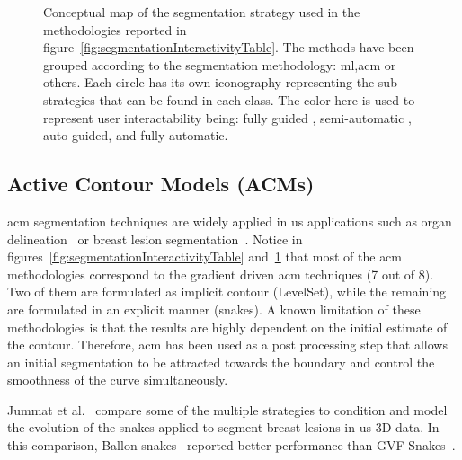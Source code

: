 \documentclass[authoryear,preprint,review,12pt]{elsarticle}
\begin{document}
\begin{landscape}
\begin{figure}
\begin{tikzpicture}[scale=4.5, every node/.style={scale=0.8}]
\end{tikzpicture}
\caption[Conceptual map of the segmentation strategies applied tu \ac{bus}]{Conceptual map of the segmentation strategy used in the methodologies reported in figure~\ref{fig:segmentationInteractivityTable}. The methods have been grouped according to the segmentation methodology: \ac{ml},\ac{acm} or others. Each circle has its own iconography representing the sub-strategies that can be found in each class. The color here is used to represent user interactability being: fully guided {\color{fullyGuided}\fullyGuidedColor}, semi-automatic {\color{semiAuto}\semiAutoColor}, auto-guided{\color{autoGuided}\autoGuidedColor}, and fully automatic{\color{fullyAuto}\fullyAutoColor}.} \label{fig:segTypeMap}
\end{figure}
\end{landscape}

\subsection{Active Contour Models (ACMs)}\label{sec:acms}
\ac{acm} segmentation techniques are widely applied in \ac{us} applications such as organ delineation~\cite{Noble:2006p1734} or breast lesion segmentation~\cite{AlemanFlores:2007p14310,Cui:2009p14325,Gao:2012p14336,Madabhushi:2003p6036,Huang:2007p6100,Huang:2005p11636,Huang:2012p14313,Liu:2010p14328}.
Notice in figures~\ref{fig:segmentationInteractivityTable} and~\ref{fig:segTypeMap} that most of the \ac{acm} methodologies correspond to the gradient driven \ac{acm} techniques (7 out of 8). Two of them are formulated as implicit contour (LevelSet), while the remaining are formulated in an explicit manner (snakes). A known limitation of these methodologies is that the results are highly dependent on the initial estimate of the contour. Therefore, \ac{acm} has been used as a post processing step that allows an initial segmentation to be attracted towards the boundary and control the smoothness of the curve simultaneously. 

Jummat et al.~\cite{jumaat2010comparison} compare some of the multiple strategies to condition and model the evolution of the snakes applied to segment breast lesions in \ac{us} 3D data. In this comparison, Ballon-snakes~\cite{cohen1991active} reported better performance than GVF-Snakes~\cite{xu1998snakes}.
\end{document}
